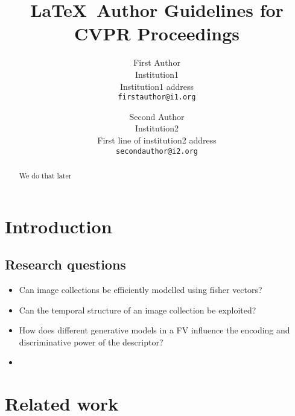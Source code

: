 \documentclass[10pt,twocolumn,letterpaper]{article}
\begin{document}
\title{\LaTeX\ Author Guidelines for CVPR Proceedings}

\author{First Author\\
Institution1\\
Institution1 address\\
{\tt\small firstauthor@i1.org}
\and
Second Author\\
Institution2\\
First line of institution2 address\\
{\tt\small secondauthor@i2.org}
}

\maketitle

\begin{abstract}
We do that later
\end{abstract}

\section{Introduction}


\subsection{Research questions}

\begin{itemize}
\item Can image collections be efficiently modelled using fisher vectors?
\item Can the temporal structure of an image collection be exploited?
\item How does different generative models in a FV influence the encoding and discriminative power of the descriptor?
\item 
\end{itemize}

\section{Related work}
\end{document}
